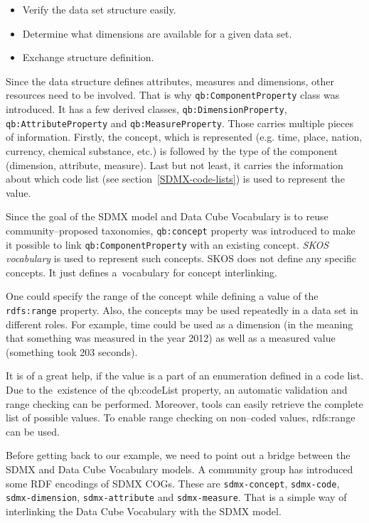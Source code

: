 \begin{itemize}
\item Verify the data set structure easily.
\item Determine what dimensions are available for a given data set.
\item Exchange structure definition.
\end{itemize}

\begin{sloppypar}
Since the data structure defines attributes, measures and dimensions, other resources need
to be involved. That is why \texttt{qb:ComponentProperty} class was introduced. It has a few derived
classes, \texttt{qb:DimensionProperty}, \texttt{qb:AttributeProperty}
and \texttt{qb:MeasureProperty}. Those carries
multiple pieces of information. Firstly, the concept, which is represented (e.g. time, place,
nation, currency, chemical substance, etc.) is followed by the type of the component
(dimension, attribute, measure). Last but not least, it carries the information about which
code list (see section~\ref{SDMX-code-lists}) is used to represent the value.
\end{sloppypar}

Since the goal of the SDMX model and Data Cube Vocabulary is to reuse community--proposed
taxonomies, \texttt{qb:concept} property was introduced to make it possible to link
\texttt{qb:ComponentProperty} with an existing concept. \emph{SKOS vocabulary} is used to
represent such concepts. SKOS does not define any specific concepts. It just defines
a~vocabulary for concept interlinking.

One could specify the range of the concept while defining a value of the \texttt{rdfs:range} property.
Also, the concepts may be used repeatedly in a data set in different roles.
For example, time could be used as a dimension (in the meaning that something was measured
in the year 2012) as well as a measured value (something took 203 seconds).

It is of a great help, if the value is a part of an enumeration defined in a code list. Due to
the~existence of the qb:codeList property, an automatic validation and range checking
can be performed. Moreover, tools can easily retrieve the complete list of possible values.
To enable range checking on non--coded values, rdfs:range can be used.

\begin{sloppypar}
Before getting back to our example, we need to point out a bridge between the SDMX
and Data Cube Vocabulary models. A community group has introduced some RDF 
encodings of SDMX COGs. These are \texttt{sdmx-concept}, \texttt{sdmx-code}, \texttt{sdmx-dimension},
\texttt{sdmx-attribute} and \texttt{sdmx-measure}. That is a simple way of interlinking the Data Cube
Vocabulary with the SDMX model.
\end{sloppypar}

